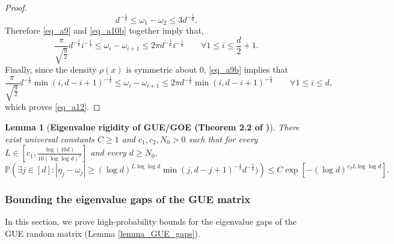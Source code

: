 \documentclass[11pt,letterpaper]{article}
\newtheorem{lemma}[theorem]{Lemma}
\begin{document}
\begin{proof}
\begin{equation}
d^{-\frac{1}{6}}   \leq \omega_1 -  \omega_2 \leq 3d^{-\frac{1}{6}}.
\end{equation}
%
Therefore \eqref{eq_a9} and \eqref{eq_a10b} together imply that,
\begin{equation}\label{eq_a9b}
\frac{\pi}{\sqrt{ \frac{9}{2}}} d^{-\frac{1}{6}}i^{-\frac{1}{3}} \leq \omega_i - \omega_{i+1} \leq 2 \pi d^{-\frac{1}{6}}i^{-\frac{1}{3}} \qquad \forall 1\leq i \leq \frac{d}{2} +1.
\end{equation}
%
Finally,  since the density $\rho(x)$ is symmetric about $0$, \eqref{eq_a9b} implies that
%
\begin{equation*}
 \frac{\pi}{\sqrt{ \frac{9}{2}}} d^{-\frac{1}{6}}\min(i, d-i+1)^{-\frac{1}{3}}\leq \omega_i - \omega_{i+1} \leq 2\pi d^{-\frac{1}{6}} \min(i, d-i+1)^{-\frac{1}{3}} \qquad \forall 1\leq i \leq d,
\end{equation*}
%
which proves \eqref{eq_a12}.
\end{proof}


\begin{lemma}[\bf Eigenvalue rigidity of GUE/GOE (Theorem 2.2 of \cite{erdHos2012rigidity})]\label{lemma_rigidity}
%
There exist universal constants $C\geq 1$ and $c_1, c_2, N_0 >0$ such that for every $L \in \left[c_1, \frac{\log(10 d)}{10 (\log\log d)^2}\right]$ and every $d \geq N_0$,
%
\begin{equation*}
    \mathbb{P}\left(\exists j \in [d] : |\eta_j - \omega_j| \geq (\log d)^{ L\log \log d} \min(j, d-j+1)^{-\frac{1}{3}} d^{-\frac{1}{6}} )\right) \leq C \exp[ -(\log d)^{c_2 L \log \log d} ].
\end{equation*}
\end{lemma}
%


\subsubsection{Bounding the eigenvalue gaps of the GUE matrix}

In this section, we prove high-probability bounds for the eigenvalue gaps of the GUE random matrix (Lemma \ref{lemma_GUE_gaps}).
\end{document}
